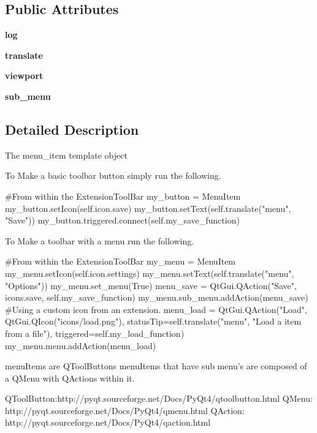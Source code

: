 \subsection*{Public Attributes}
\begin{DoxyCompactItemize}
\item 
\hypertarget{classcommotion__client_1_1GUI_1_1extension__toolbar_1_1MenuItem_a6984ce2f476f256d285f1517d9beead6}{{\bfseries log}}\label{classcommotion__client_1_1GUI_1_1extension__toolbar_1_1MenuItem_a6984ce2f476f256d285f1517d9beead6}

\item 
\hypertarget{classcommotion__client_1_1GUI_1_1extension__toolbar_1_1MenuItem_a0134e71e4901cc4eec9b50785cba7265}{{\bfseries translate}}\label{classcommotion__client_1_1GUI_1_1extension__toolbar_1_1MenuItem_a0134e71e4901cc4eec9b50785cba7265}

\item 
\hypertarget{classcommotion__client_1_1GUI_1_1extension__toolbar_1_1MenuItem_a49032d0bb2b22e07d66a228d756d9350}{{\bfseries viewport}}\label{classcommotion__client_1_1GUI_1_1extension__toolbar_1_1MenuItem_a49032d0bb2b22e07d66a228d756d9350}

\item 
\hypertarget{classcommotion__client_1_1GUI_1_1extension__toolbar_1_1MenuItem_a6bc93d5526252a71a9543f75df2aeac6}{{\bfseries sub\-\_\-menu}}\label{classcommotion__client_1_1GUI_1_1extension__toolbar_1_1MenuItem_a6bc93d5526252a71a9543f75df2aeac6}

\end{DoxyCompactItemize}


\subsection{Detailed Description}
\begin{DoxyVerb}The menu_item template object

To Make a basic toolbar button simply run the following.

#From within the ExtensionToolBar
my_button = MenuItem
my_button.setIcon(self.icon.save)
my_button.setText(self.translate("menu", "Save"))
my_button.triggered.connect(self.my_save_function)

To Make a toolbar with a menu run the following.

#From within the ExtensionToolBar
my_menu = MenuItem
my_menu.setIcon(self.icon.settings)
my_menu.setText(self.translate("menu", "Options"))
my_menu.set_menu(True)
menu_save = QtGui.QAction("Save", icons.save, self.my_save_function)
my_menu.sub_menu.addAction(menu_save)
#Using a custom icon from an extension.
menu_load = QtGui.QAction("Load", QtGui.QIcon("icons/load.png"), statusTip=self.translate("menu", "Load a item from a file"), triggered=self.my_load_function)
my_menu.menu.addAction(menu_load)

menuItems are QToolButtons
menuItems that have sub menu's are composed of a QMenu with QActions within it.

QToolButton:http://pyqt.sourceforge.net/Docs/PyQt4/qtoolbutton.html
QMenu: http://pyqt.sourceforge.net/Docs/PyQt4/qmenu.html
QAction: http://pyqt.sourceforge.net/Docs/PyQt4/qaction.html\end{DoxyVerb}
 

